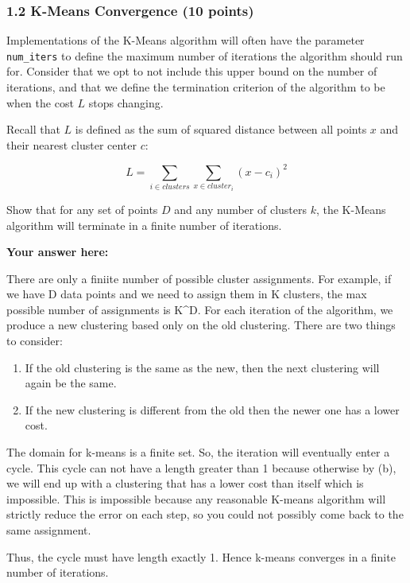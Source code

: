 \documentclass[11pt]{article}
\providecommand{\tightlist}{%
      \setlength{\itemsep}{0pt}\setlength{\parskip}{0pt}}
\begin{document}
    \subsubsection{1.2 K-Means Convergence (10
points)}\label{k-means-convergence-10-points}

Implementations of the K-Means algorithm will often have the parameter
\texttt{num\_iters} to define the maximum number of iterations the
algorithm should run for. Consider that we opt to not include this upper
bound on the number of iterations, and that we define the termination
criterion of the algorithm to be when the cost \(L\) stops changing.

Recall that \(L\) is defined as the sum of squared distance between all
points \(x\) and their nearest cluster center \(c\):

\[L = \sum_{i \in clusters}\sum_{x \in cluster_i} (x - c_i)^2\]

Show that for any set of points \textbf{\(D\)} and any number of
clusters \(k\), the K-Means algorithm will terminate in a finite number
of iterations.

    \textbf{Your answer here:}

There are only a finiite number of possible cluster assignments. For
example, if we have D data points and we need to assign them in K
clusters, the max possible number of assignments is K\^{}D. For each
iteration of the algorithm, we produce a new clustering based only on
the old clustering. There are two things to consider:

\begin{enumerate}
\def\labelenumi{\alph{enumi})}
\tightlist
\item
  If the old clustering is the same as the new, then the next clustering
  will again be the same.
\item
  If the new clustering is different from the old then the newer one has
  a lower cost.
\end{enumerate}

The domain for k-means is a finite set. So, the iteration will
eventually enter a cycle. This cycle can not have a length greater than
1 because otherwise by (b), we will end up with a clustering that has a
lower cost than itself which is impossible. This is impossible because
any reasonable K-means algorithm will strictly reduce the error on each
step, so you could not possibly come back to the same assignment.

Thus, the cycle must have length exactly 1. Hence k-means converges in a
finite number of iterations.
\end{document}
